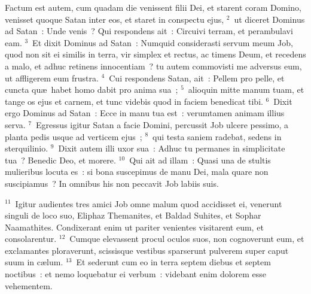 \lettrine[lines=3,image=true,loversize=0.05,lraise=-0.03]{F}{}actum est autem, cum quadam die venissent filii Dei, et starent coram Domino, venisset quoque Satan inter eos, et staret in conspectu ejus,
${}^{2}$~ut diceret Dominus ad Satan~: Unde venis~? Qui respondens ait~: Circuivi terram, et perambulavi eam.
${}^{3}$~Et dixit Dominus ad Satan~: Numquid considerasti servum meum Job, quod non sit ei similis in terra, vir simplex et rectus, ac timens Deum, et recedens a malo, et adhuc retinens innocentiam~? tu autem commovisti me adversus eum, ut affligerem eum frustra.
${}^{4}$~Cui respondens Satan, ait~: Pellem pro pelle, et cuncta qu\ae\ habet homo dabit pro anima sua~;
${}^{5}$~alioquin mitte manum tuam, et tange os ejus et carnem, et tunc videbis quod in faciem benedicat tibi.
${}^{6}$~Dixit ergo Dominus ad Satan~: Ecce in manu tua est~: verumtamen animam illius serva.
${}^{7}$~Egressus igitur Satan a facie Domini, percussit Job ulcere pessimo, a planta pedis usque ad verticem ejus~;
${}^{8}$~qui testa saniem radebat, sedens in sterquilinio.
${}^{9}$~Dixit autem illi uxor sua~: Adhuc tu permanes in simplicitate tua~? Benedic Deo, et morere.
${}^{10}$~Qui ait ad illam~: Quasi una de stultis mulieribus locuta es~: si bona suscepimus de manu Dei, mala quare non suscipiamus~? In omnibus his non peccavit Job labiis suis.


${}^{11}$~Igitur audientes tres amici Job omne malum quod accidisset ei, venerunt singuli de loco suo, Eliphaz Themanites, et Baldad Suhites, et Sophar Naamathites. Condixerant enim ut pariter venientes visitarent eum, et consolarentur.
${}^{12}$~Cumque elevassent procul oculos suos, non cognoverunt eum, et exclamantes ploraverunt, scissisque vestibus sparserunt pulverem super caput suum in c\ae lum.
${}^{13}$~Et sederunt cum eo in terra septem diebus et septem noctibus~: et nemo loquebatur ei verbum~: videbant enim dolorem esse vehementem.

